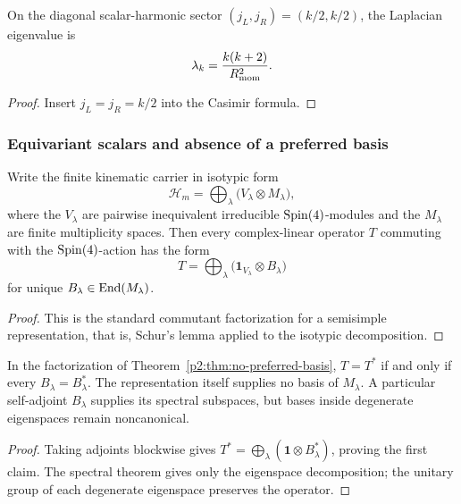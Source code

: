 \documentclass[12pt,a4paper]{article}
\begin{document}
\begin{corollary}
\label{p2:cor:laplace-spectrum}
On the diagonal scalar-harmonic sector $(j_L,j_R)=(k/2,k/2)$, the Laplacian eigenvalue is
\begin{equation}
\lambda_k=\frac{k(k+2)}{R_{\mathrm{mom}}^2}.
\end{equation}
\end{corollary}

\begin{proof}
Insert $j_L=j_R=k/2$ into the Casimir formula.
\end{proof}

\subsubsection{Equivariant scalars and absence of a preferred basis}
\label{p2:subsec:no-preferred-basis}

\begin{theorem}
\label{p2:thm:no-preferred-basis}
Write the finite kinematic carrier in isotypic form
\[
\mathcal H_m
=
\bigoplus_{\lambda}\bigl(V_\lambda\otimes M_\lambda\bigr),
\]
where the \(V_\lambda\) are pairwise inequivalent irreducible \(\mathrm{Spin}(4)\)-modules and the \(M_\lambda\) are finite multiplicity spaces. Then every complex-linear operator \(T\) commuting with the \(\mathrm{Spin}(4)\)-action has the form
\[
T
=
\bigoplus_{\lambda}\bigl(\mathbf 1_{V_\lambda}\otimes B_\lambda\bigr)
\]
for unique \(B_\lambda\in \operatorname{End}(M_\lambda)\).
\end{theorem}

\begin{proof}
This is the standard commutant factorization for a semisimple representation,
that is, Schur's lemma applied to the isotypic decomposition.
\end{proof}

\begin{corollary}
\label{p2d:cor:selfadjoint-schur-blocks}
In the factorization of Theorem~\ref{p2:thm:no-preferred-basis},
\(T=T^*\) if and only if every \(B_\lambda=B_\lambda^*\).  The representation
itself supplies no basis of \(M_\lambda\).  A particular self-adjoint
\(B_\lambda\) supplies its spectral subspaces, but bases inside degenerate
eigenspaces remain noncanonical.
\end{corollary}

\begin{proof}
Taking adjoints blockwise gives
\(T^*=\bigoplus_\lambda(\mathbf1\otimes B_\lambda^*)\), proving the first
claim.  The spectral theorem gives only the eigenspace decomposition; the
unitary group of each degenerate eigenspace preserves the operator.
\end{proof}
\end{document}
